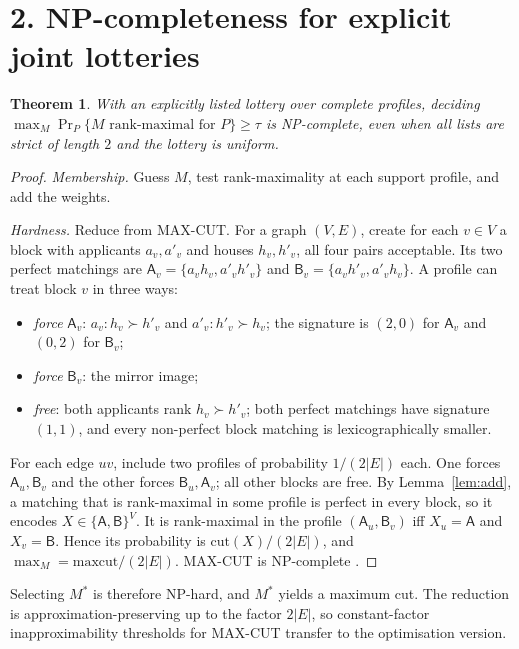 \documentclass[11pt]{article}
\newtheorem{theorem}{Theorem}
\theoremstyle{definition}
\begin{document}
\section*{2. NP-completeness for explicit joint lotteries}
\begin{theorem}\label{thm:np}
With an explicitly listed lottery over complete profiles, deciding $\max_M\Pr_P\{M\text{ rank-maximal for }P\}\ge\tau$ is
NP-complete, even when all lists are strict of length $2$ and the lottery is uniform.
\end{theorem}
\begin{proof}
\emph{Membership.} Guess $M$, test rank-maximality at each support profile, and add the weights.

\emph{Hardness.} Reduce from MAX-CUT. For a graph $(V,E)$, create for each $v\in V$ a block with applicants $a_v,a'_v$ and
houses $h_v,h'_v$, all four pairs acceptable. Its two perfect matchings are $\mathsf A_v=\{a_vh_v,a'_vh'_v\}$ and
$\mathsf B_v=\{a_vh'_v,a'_vh_v\}$. A profile can treat block $v$ in three ways:
\begin{itemize}
\item \emph{force} $\mathsf A_v$: $a_v:h_v\succ h'_v$ and $a'_v:h'_v\succ h_v$; the signature is $(2,0)$ for $\mathsf A_v$
and $(0,2)$ for $\mathsf B_v$;
\item \emph{force} $\mathsf B_v$: the mirror image;
\item \emph{free}: both applicants rank $h_v\succ h'_v$; both perfect matchings have signature $(1,1)$, and every
non-perfect block matching is lexicographically smaller.
\end{itemize}
For each edge $uv$, include two profiles of probability $1/(2|E|)$ each. One forces $\mathsf A_u,\mathsf B_v$ and the other
forces $\mathsf B_u,\mathsf A_v$; all other blocks are free.
By Lemma~\ref{lem:add}, a matching that is rank-maximal in some profile is perfect in every block, so it encodes
$X\in\{\mathsf A,\mathsf B\}^V$. It is rank-maximal in the profile $(\mathsf A_u,\mathsf B_v)$ iff $X_u=\mathsf A$ and $X_v=\mathsf B$.
Hence its probability is $\mathrm{cut}(X)/(2|E|)$, and $\max_M=\mathrm{maxcut}/(2|E|)$. MAX-CUT is NP-complete \cite{gj}.
\end{proof}
Selecting $M^*$ is therefore NP-hard, and $M^*$ yields a maximum cut. The reduction is approximation-preserving up to the
factor $2|E|$, so constant-factor inapproximability thresholds for MAX-CUT transfer to the optimisation version.
\end{document}
